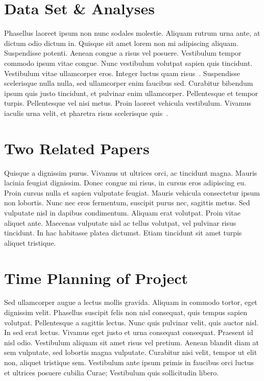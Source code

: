 \documentclass[10pt, conference]{IEEEtran}
\begin{document}
\section{Data Set \& Analyses}
\label{sec:backgr-relat-work}

Phasellus laoreet ipsum non nunc sodales molestie. Aliquam rutrum urna ante, at dictum odio dictum in. Quisque sit amet lorem non mi adipiscing aliquam. Suspendisse potenti. Aenean congue a risus vel posuere. Vestibulum tempor commodo ipsum vitae congue. Nunc vestibulum volutpat sapien quis tincidunt. Vestibulum vitae ullamcorper eros. Integer luctus quam risus~\cite{humble10}. Suspendisse scelerisque nulla nulla, sed ullamcorper enim faucibus sed. Curabitur bibendum ipsum quis justo tincidunt, et pulvinar enim ullamcorper. Pellentesque et tempor turpis. Pellentesque vel nisi metus. Proin laoreet vehicula vestibulum. Vivamus iaculis urna velit, et pharetra risus scelerisque quis~\cite{baysal11}.

\section{Two Related Papers}
\label{sec:two-related-papers}

Quisque a dignissim purus. Vivamus ut ultrices orci, ac tincidunt magna. Mauris lacinia feugiat dignissim. Donec congue mi risus, in cursus eros adipiscing eu. Proin cursus nulla et sapien vulputate feugiat. Mauris vehicula consectetur ipsum non lobortis. Nunc nec eros fermentum, suscipit purus nec, sagittis metus. Sed vulputate nisl in dapibus condimentum. Aliquam erat volutpat. Proin vitae aliquet ante. Maecenas vulputate nisl ac tellus volutpat, vel pulvinar risus tincidunt. In hac habitasse platea dictumst. Etiam tincidunt sit amet turpis aliquet tristique.

\section{Time Planning of Project}
\label{sec:schedule}

Sed ullamcorper augue a lectus mollis gravida. Aliquam in commodo tortor, eget dignissim velit. Phasellus suscipit felis non nisl consequat, quis tempus sapien volutpat. Pellentesque a sagittis lectus. Nunc quis pulvinar velit, quis auctor nisl. In sed erat lectus. Vivamus eget justo et urna consequat consequat. Praesent id nisl odio. Vestibulum aliquam sit amet risus vel pretium. Aenean blandit diam at sem vulputate, sed lobortis magna vulputate. Curabitur nisi velit, tempor ut elit non, aliquet tristique sem. Vestibulum ante ipsum primis in faucibus orci luctus et ultrices posuere cubilia Curae; Vestibulum quis sollicitudin libero.

\balance


\end{document}
